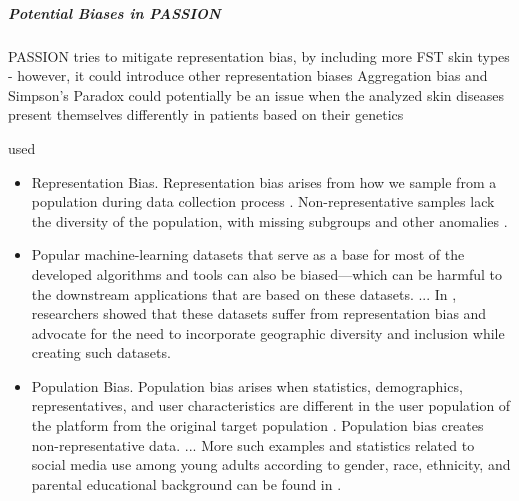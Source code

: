 \documentclass[12pt, a4paper, oneside]{book}   	%
\newif\ifrawcitationactive
\newcommand{\rawcitationstart}{
	\color{purple}\rawcitationactivetrue
}
\newcommand{\rawcitationusedstart}{\color{violet}}
\begin{document}
				
				\subparagraph{Potential Biases in PASSION}
				PASSION tries to mitigate representation bias, by including more FST skin types - however, it could introduce other representation biases
				Aggregation bias and Simpson's Paradox could potentially be an issue when the analyzed skin diseases present themselves differently in patients based on their genetics
				
				
				\rawcitationstart
				used
				\begin{itemize}		
					\rawcitationusedstart
					\item Representation Bias. Representation bias arises from how we sample from a population during data collection process \autocite{M144_Suresh_2021}. Non-representative samples lack the diversity of the population, with missing subgroups and other anomalies \autocite{Mehrabi_2021}.
					\item Popular machine-learning datasets that serve as a base for most of the developed algorithms and tools can also be biased—which can be harmful to the downstream applications that are based on these datasets. ... In \autocite{M142_Shankar_2017}, researchers showed that these datasets suffer from representation bias and advocate for the need to incorporate geographic diversity and inclusion while creating such datasets. \autocite{Mehrabi_2021}
				
					\item Population Bias. Population bias arises when statistics, demographics, representatives, and user characteristics are different in the user population of the platform from the original target population \autocite{M120_Olteanu_2019}. Population bias creates non-representative data. ... More such examples and statistics related to social media use among young adults according to gender, race, ethnicity, and parental educational background can be found in \autocite{M64_Hargittai_2007}. \autocite{Mehrabi_2021}
				

\end{itemize}
\end{document}
